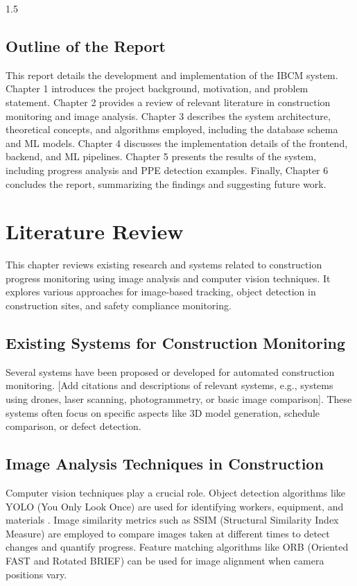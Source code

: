 \documentclass[12pt,a4paper]{report}
\begin{document}
\begin{spacing}{1.5}
    \section{Outline of the Report}
    This report details the development and implementation of the IBCM system. Chapter 1 introduces the project background, motivation, and problem statement. Chapter 2 provides a review of relevant literature in construction monitoring and image analysis. Chapter 3 describes the system architecture, theoretical concepts, and algorithms employed, including the database schema and ML models. Chapter 4 discusses the implementation details of the frontend, backend, and ML pipelines. Chapter 5 presents the results of the system, including progress analysis and PPE detection examples. Finally, Chapter 6 concludes the report, summarizing the findings and suggesting future work.

    \chapter{Literature Review}
    \label{chap:literature_review}

    This chapter reviews existing research and systems related to construction progress monitoring using image analysis and computer vision techniques. It explores various approaches for image-based tracking, object detection in construction sites, and safety compliance monitoring.

    \section{Existing Systems for Construction Monitoring}
    Several systems have been proposed or developed for automated construction monitoring. [Add citations and descriptions of relevant systems, e.g., systems using drones, laser scanning, photogrammetry, or basic image comparison]. These systems often focus on specific aspects like 3D model generation, schedule comparison, or defect detection.

    \section{Image Analysis Techniques in Construction}
    Computer vision techniques play a crucial role. Object detection algorithms like YOLO (You Only Look Once) are used for identifying workers, equipment, and materials \cite{YOLO}. Image similarity metrics such as SSIM (Structural Similarity Index Measure) \cite{SSIM} are employed to compare images taken at different times to detect changes and quantify progress. Feature matching algorithms like ORB (Oriented FAST and Rotated BRIEF) \cite{ORB} can be used for image alignment when camera positions vary.


\end{spacing}
\end{document}
